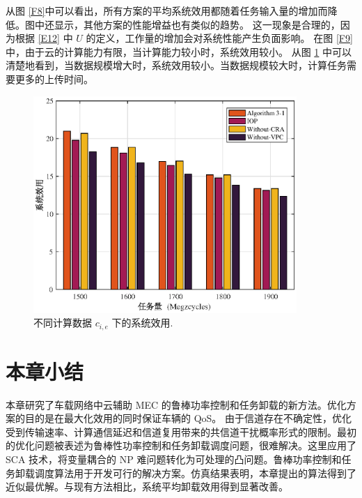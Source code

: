 从图 \ref{F8}中可以看出，所有方案的平均系统效用都随着任务输入量的增加而降低。图中还显示，其他方案的性能增益也有类似的趋势。
这一现象是合理的，因为根据 \eqref{E12} 中 $U$ 的定义，工作量的增加会对系统性能产生负面影响。
在图 \ref{F9}中，由于云的计算能力有限，当计算能力较小时，系统效用较小。
从图 \ref{F10} 中可以清楚地看到，当数据规模增大时，系统效用较小。当数据规模较大时，计算任务需要更多的上传时间。
\begin{figure}[H]
\centering
\includegraphics[width=10cm]{figures//chap3//diff_c.eps}
\caption{不同计算数据 $c_{i,e}$ 下的系统效用.}
\label{F10}
\end{figure}

\section{本章小结}\label{section3-5}
本章研究了车载网络中云辅助 MEC 的鲁棒功率控制和任务卸载的新方法。优化方案的目的是在最大化效用的同时保证车辆的 QoS。 由于信道存在不确定性，优化受到传输速率、计算通信延迟和信道复用带来的共信道干扰概率形式的限制。最初的优化问题被表述为鲁棒性功率控制和任务卸载调度问题，很难解决。这里应用了 SCA 技术，将变量耦合的 NP 难问题转化为可处理的凸问题。鲁棒功率控制和任务卸载调度算法用于开发可行的解决方案。仿真结果表明，本章提出的算法得到了近似最优解。与现有方法相比，系统平均卸载效用得到显著改善。

%
